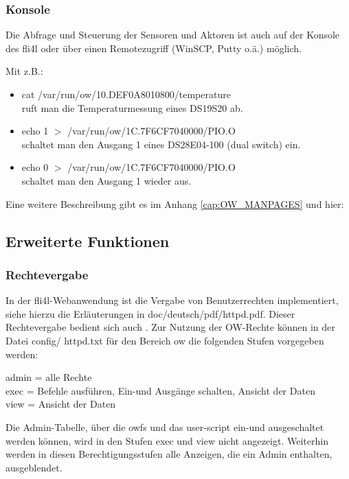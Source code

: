 \subsubsection{Konsole}
Die Abfrage und Steuerung der Sensoren und Aktoren ist auch auf der Konsole des
fli4l oder über einen Remotezugriff (WinSCP, Putty o.ä.) möglich.

Mit z.B.:
\begin{itemize}
\item cat /var/run/ow/10.DEF0A8010800/temperature \\
      ruft man die Temperaturmessung eines DS19S20 ab.
\item echo \dq{}1\dq{} $>$ /var/run/ow/1C.7F6CF7040000/PIO.O \\
      schaltet man den Ausgang 1 eines DS28E04-100 (dual switch) ein.
\item echo \dq{}0\dq{} $>$ /var/run/ow/1C.7F6CF7040000/PIO.O \\
      schaltet man den Ausgang 1 wieder aus.
\end{itemize}

Eine weitere Beschreibung gibt es im Anhang \glqq{}\ref{cap:OW_MANPAGES}\grqq{} und hier: \\


\subsection{Erweiterte Funktionen}
\subsubsection{Rechtevergabe}
In der fli4l-Webanwendung ist die Vergabe von Benutzerrechten implementiert, siehe
hierzu die Erläuterungen in doc/deutsch/pdf/httpd.pdf. Dieser Rechtevergabe bedient
sich auch . Zur Nutzung der OW-Rechte können in der Datei config/
httpd.txt für den Bereich \glqq{}ow\grqq{} die folgenden Stufen vorgegeben werden:

admin = alle Rechte\\
exec = Befehle ausführen, Ein-und Ausgänge schalten, Ansicht der Daten\\
view = Ansicht der Daten

Die Admin-Tabelle, über die owfs und das user-script ein-und ausgeschaltet werden
können, wird in den Stufen \glqq{}exec\grqq{} und \glqq{}view\grqq{} nicht angezeigt. Weiterhin werden in
diesen Berechtigungsstufen alle Anzeigen, die ein \glqq{}Admin\grqq{} enthalten, ausgeblendet.


